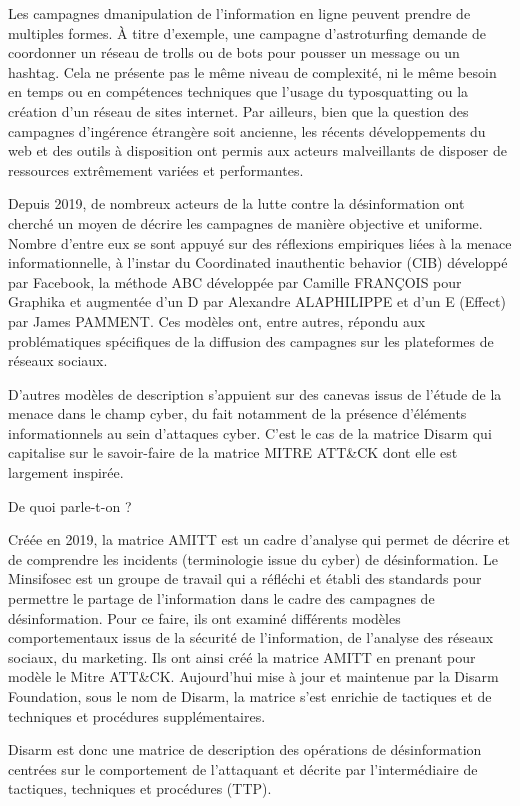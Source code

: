 Les campagnes dmanipulation de l’information en ligne peuvent prendre de multiples formes. À titre d’exemple, une campagne d’astroturfing demande de coordonner un réseau de trolls ou de bots pour pousser un message ou un hashtag. Cela ne présente pas le même niveau de complexité, ni le même besoin en temps ou en compétences techniques que l’usage du typosquatting ou la création d’un réseau de sites internet. Par ailleurs, bien que la question des campagnes d’ingérence étrangère soit ancienne, les récents développements du web et des outils à disposition ont permis aux acteurs malveillants de disposer de ressources extrêmement variées et performantes.

Depuis 2019, de nombreux acteurs de la lutte contre la désinformation ont cherché un moyen de décrire les campagnes de manière objective et uniforme. Nombre d’entre eux se sont appuyé sur des réflexions empiriques liées à la menace informationnelle, à l’instar du Coordinated inauthentic behavior (CIB) développé par Facebook, la méthode ABC développée par Camille FRANÇOIS pour Graphika et augmentée d’un D par Alexandre ALAPHILIPPE et d’un E (Effect) par James PAMMENT. Ces modèles ont, entre autres, répondu aux problématiques spécifiques de la diffusion des campagnes sur les plateformes de réseaux sociaux.

D’autres modèles de description s’appuient sur des canevas issus de l’étude de la menace dans le champ cyber, du fait notamment de la présence d’éléments informationnels au sein d’attaques cyber. C’est le cas de la matrice Disarm qui capitalise sur le savoir-faire de la matrice MITRE ATT&CK dont elle est largement inspirée.

De quoi parle-t-on ?

Créée en 2019, la matrice AMITT est un cadre d’analyse qui permet de décrire et de comprendre les incidents (terminologie issue du cyber) de désinformation. Le Minsifosec est un groupe de travail qui a réfléchi et établi des standards pour permettre le partage de l’information dans le cadre des campagnes de désinformation. Pour ce faire, ils ont examiné différents modèles comportementaux issus de la sécurité de l’information, de l’analyse des réseaux sociaux, du marketing. Ils ont ainsi créé la matrice AMITT en prenant pour modèle le Mitre ATT&CK. Aujourd'hui mise à jour et maintenue par la Disarm Foundation, sous le nom de Disarm, la matrice s’est enrichie de tactiques et de techniques et procédures supplémentaires.

Disarm est donc une matrice de description des opérations de désinformation centrées sur le comportement de l’attaquant et décrite par l'intermédiaire de tactiques, techniques et procédures (TTP).

